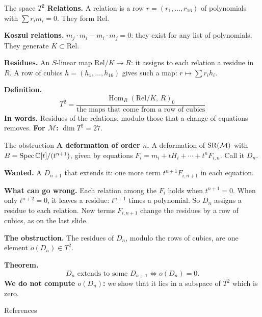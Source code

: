 \begin{frame}{The space \(T^2\)}
\textbf{Relations.} A relation is a row \(r=(r_1,\dots,r_{16})\) of polynomials with \(\sum r_im_i=0\). They form \(\mathrm{Rel}\).
\par
\textbf{Koszul relations.} \(m_j\cdot m_i-m_i\cdot m_j=0\): they exist for any list of polynomials. They generate \(K\subset\mathrm{Rel}\).
\par
\textbf{Residues.} An \(S\)-linear map \(\mathrm{Rel}/K\to R\): it assigns to each relation a residue in \(R\). A row of cubics \(h=(h_1,\dots,h_{16})\) gives such a map: \(r\mapsto\sum r_ih_i\).
\par
\textbf{Definition.}
\[
\boxed{T^2=\frac{\operatorname{Hom}_R(\mathrm{Rel}/K,\,R)_0}{\text{the maps that come from a row of cubics}}}
\]
\textbf{In words.} Residues of the relations, modulo those that a change of equations removes. \textbf{For \(\mathcal M\):} \(\dim T^2=27\).
\end{frame}

\begin{frame}{The obstruction}
\textbf{A deformation of order \(n\).} A deformation of \(\operatorname{SR}(\mathcal M)\) with \(B=\operatorname{Spec}\mathbb C[t]/(t^{n+1})\), given by equations \(F_i=m_i+tH_i+\cdots+t^nF_{i,n}\). Call it \(D_n\).
\par
\textbf{Wanted.} A \(D_{n+1}\) that extends it: one more term \(t^{n+1}F_{i,n+1}\) in each equation.
\par
\textbf{What can go wrong.} Each relation among the \(F_i\) holds when \(t^{n+1}=0\). When only \(t^{n+2}=0\), it leaves a residue: \(t^{n+1}\) times a polynomial. So \(D_n\) assigns a residue to each relation. New terms \(F_{i,n+1}\) change the residues by a row of cubics, as on the last slide.
\par
\textbf{The obstruction.} The residues of \(D_n\), modulo the rows of cubics, are one element \(o(D_n)\in T^2\).
\par
\textbf{Theorem.}
\[
\boxed{D_n\text{ extends to some }D_{n+1}\iff o(D_n)=0.}
\]
\textbf{We do not compute \(o(D_n)\):} we show that it lies in a subspace of \(T^2\) which is zero.
\end{frame}

\begin{frame}[allowframebreaks]{References}
\printbibliography[heading=none]
\end{frame}

